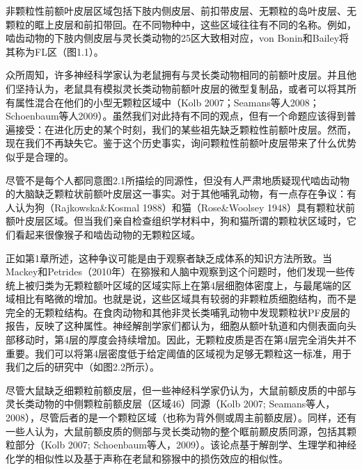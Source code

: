 非颗粒性前额叶皮层区域包括下肢内侧皮层、前扣带皮层、无颗粒的岛叶皮层、无颗粒的眶上皮层和前扣带回。在不同物种中，这些区域往往有不同的名称。例如，啮齿动物的下肢内侧皮层与灵长类动物的25区大致相对应，von Bonin和Bailey将其称为FL区（图1.1）。

众所周知，许多神经科学家认为老鼠拥有与灵长类动物相同的前额叶皮层。并且他们坚持认为，老鼠具有模拟灵长类动物前额叶皮层的微型复制品，或者可以将其所有属性混合在他们的小型无颗粒区域中（Kolb 2007；Seamans等人2008；Schoenbaum等人2009）。虽然我们对此持有不同的观点，但有一个命题应该得到普遍接受：在进化历史的某个时刻，我们的某些祖先缺乏颗粒性前额叶皮层。然而，现在我们不再缺失它。鉴于这个历史事实，询问颗粒性前额叶皮层带来了什么优势似乎是合理的。

尽管不是每个人都同意图2.1所描绘的同源性，但没有人严肃地质疑现代啮齿动物的大脑缺乏颗粒状前额叶皮层这一事实。对于其他哺乳动物，有一点存在争议：有人认为狗（Rajkowska\&Kosmal 1988）和猫（Rose\&Woolsey 1948）具有颗粒状前额叶皮层区域。但当我们亲自检查组织学材料中，狗和猫所谓的颗粒状区域时，它们看起来很像猴子和啮齿动物的无颗粒区域。

正如第1章所述，这种争议可能是由于观察者缺乏成体系的知识方法所致。当Mackey和Petrides（2010年）在猕猴和人脑中观察到这个问题时，他们发现一些传统上被归类为无颗粒额叶区域的区域实际上在第4层细胞体密度上，与最尾端的区域相比有略微的增加。也就是说，这些区域具有较弱的非颗粒质细胞结构，而不是完全的无颗粒结构。在食肉动物和其他非灵长类哺乳动物中发现颗粒状PF皮层的报告，反映了这种属性。神经解剖学家们都认为，细胞从额叶轨道和内侧表面向头部移动时，第4层的厚度会持续增加。因此，无颗粒皮质是否在第4层完全消失并不重要。我们可以将第4层密度低于给定阈值的区域视为足够无颗粒这一标准，用于我们之后的研究中（如图2.2所示）。

尽管大鼠缺乏细颗粒前额皮层，但一些神经科学家仍认为，大鼠前额皮质的中部与灵长类动物的中侧颗粒前额皮层（区域46）同源（Kolb 2007; Seamans等人，2008），尽管后者的是一个颗粒区域（也称为背外侧或周主前额皮层）。同样，还有一些人认为，大鼠前额皮质的侧部与灵长类动物的整个眶前颞皮质同源，包括其颗粒部分（Kolb 2007; Schoenbaum等人，2009）。该论点基于解剖学、生理学和神经化学的相似性以及基于声称在老鼠和猕猴中的损伤效应的相似性。

